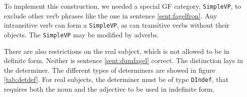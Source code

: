 \documentclass{report}
\begin{document}
To implement this construction, we needed a
special GF category, \verb|SimpleVP|, to exclude other verb phrases
like the one in sentence \ref{sent:fagelfron}. Any intransitive verb can form
a \verb-SimpleVP-, as can transitive verbs without their objects. The \verb-SimpleVP-
may be modified by adverbs.

There are also restrictions on the real subject, which is not allowed to be in
definite form.
Neither is sentence \ref{sent:dumfagel} correct.
\label{sent:dumfagel}
The distinction lays in the determiner. The different types of determiners are
showed in figure \ref{tab:detdef}. 
For real subjects, the determiner must be of type \verb-DIndef-,
that requires both the noun and the adjective to be used in indefinite form.
%
\end{document}
